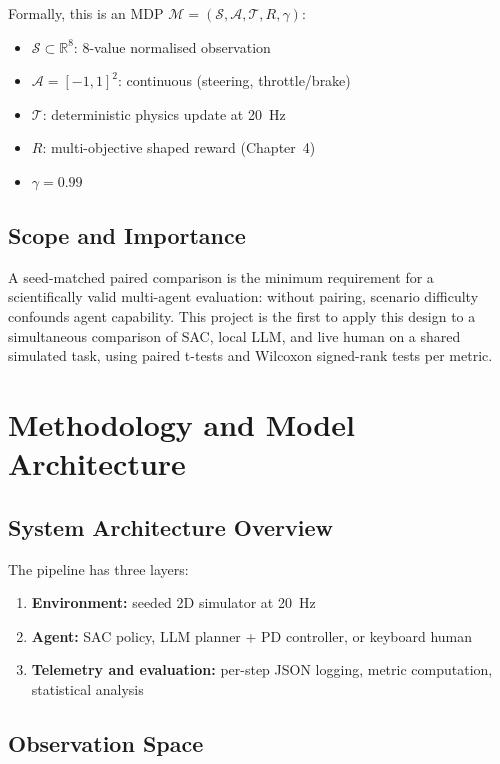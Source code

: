 \documentclass[12pt,a4paper]{report}
\begin{document}
Formally, this is an MDP $\mathcal{M} = (\mathcal{S}, \mathcal{A}, \mathcal{T}, R, \gamma)$:
\begin{itemize}
  \item $\mathcal{S} \subset \mathbb{R}^8$: 8-value normalised observation
  \item $\mathcal{A} = [-1,1]^2$: continuous (steering, throttle/brake)
  \item $\mathcal{T}$: deterministic physics update at 20~Hz
  \item $R$: multi-objective shaped reward (Chapter~4)
  \item $\gamma = 0.99$
\end{itemize}

\section{Scope and Importance}

A seed-matched paired comparison is the minimum requirement for a scientifically valid multi-agent evaluation: without pairing, scenario difficulty confounds agent capability. This project is the first to apply this design to a simultaneous comparison of SAC, local LLM, and live human on a shared simulated task, using paired t-tests and Wilcoxon signed-rank tests per metric.

\chapter{Methodology and Model Architecture}

\section{System Architecture Overview}

The pipeline has three layers:
\begin{enumerate}
  \item \textbf{Environment:} seeded 2D simulator at 20~Hz
  \item \textbf{Agent:} SAC policy, LLM planner + PD controller, or keyboard human
  \item \textbf{Telemetry and evaluation:} per-step JSON logging, metric computation, statistical analysis
\end{enumerate}

\section{Observation Space}
\end{document}
